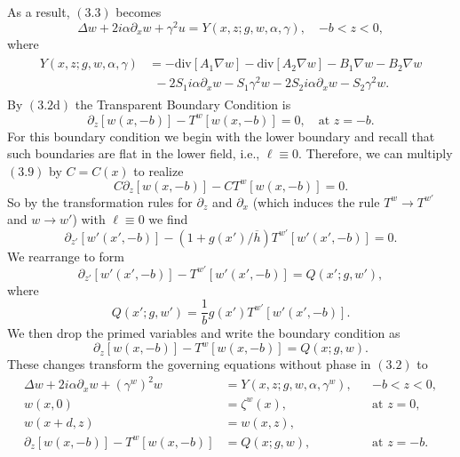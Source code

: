As a result, $(3.3)$ becomes
\begin{equation}\Delta w +2i\alpha\partial_xw+\gamma^2u=Y(x,z;g,w,\alpha,\gamma),\quad \text{$-b<z<0$}, \end{equation}
where
\begin{align}
\begin{split}
Y(x,z;g,w,\alpha,\gamma)&=-\text{div}[A_1\nabla w]-\text{div}[A_2\nabla w]-B_1\nabla w - B_2\nabla w\\&~~-2S_1i\alpha\partial_xw-S_1\gamma^2w-2S_2i\alpha\partial_xw-S_2\gamma^2w.
\end{split}
\end{align}
By $(3.2\text{d})$ the Transparent Boundary Condition is
\begin{equation}\partial_z \left[w(x,-b)\right] - T^w[w(x,-b)]=0,\quad \text{at $z=-b$}. \end{equation}
For this boundary condition we begin with the lower boundary and recall that such boundaries are flat in the lower field, i.e., $\ell\equiv 0$. Therefore, we can multiply $(3.9)$ by $C=C(x)$ to realize
$$C\partial_{z} \left[w(x,-b)\right] - CT^w[w(x,-b)]=0.$$
So by the transformation rules for $\partial_z$ and $\partial_x$ (which induces the rule $T^w\to T^{w'}$ and $w \to w'$) with $\ell\equiv 0$ we find
$$\partial_{z'} \left[w'(x',-b)\right] - (1+g(x')/ \overline{h})T^{w'}[w'(x',-b)]=0.$$
We rearrange to form
$$\partial_{z'} \left[w'(x',-b)\right] - T^{w'}[w'(x',-b)]=Q(x';g,w'),$$
where
$$Q(x';g,w')=\frac{1}{b}g(x')T^{w'}\left[w'(x',-b)\right].$$
We then drop the primed variables and write the boundary condition as
$$\partial_z \left[w(x,-b)\right] - T^w[w(x,-b)]=Q(x;g,w).$$
These changes transform the governing equations without phase in $(3.2)$ to
\begin{subequations}
\begin{align}
\Delta w +2i\alpha\partial_xw+(\gamma^w)^2w&=Y\left(x,z;g,w,\alpha,\gamma^w\right),&&\text{$-b<z<0$}, \\
w(x,0)&=\zeta^w(x),&& \text{at $z=0$}, \\
w(x+d,z)&=w(x,z), \\
\partial_z \left[w(x,-b)\right] - T^w[w(x,-b)]&=Q(x;g,w),&& \text{at $z=-b$}.
\end{align}
\end{subequations}